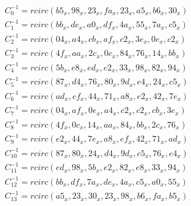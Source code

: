 \begin{gather}
C_0^{-1} = rcirc(b5_x, 98_x, 23_x, fa_x, 23_x, a5_x, b6_x, 30_x)\label{shirai-0-inv}\\
C_1^{-1} = rcirc(bb_x, de_x, a0_x, df_x, 4a_x, 55_x, 7a_x, c5_x)\label{shirai-1-inv}\\
C_2^{-1} = rcirc(04_x, a4_x, cb_x, af_x, c2_x, 3e_x, 0e_x, c2_x)\label{shirai-2-inv}\\
C_3^{-1} = rcirc(4f_x, aa_x, 2c_x, 0c_x, 84_x, 76_x, 14_x, bb_x)\label{shirai-3-inv}\\
C_4^{-1} = rcirc(5b_x, e8_x, ed_x, e2_x, 33_x, 98_x, 82_x, 94_x)\label{shirai-4-inv}\\
C_5^{-1} = rcirc(87_x, d4_x, 76_x, 80_x, 9d_x, e4_x, 24_x, c5_x)\label{shirai-5-inv}\\
C_6^{-1} = rcirc(ad_x, ef_x, 44_x, 71_x, a8_x, e2_x, 42_x, 7e_x)\label{shirai-6-inv}\\
C_7^{-1} = rcirc(04_x, af_x, 0e_x, a4_x, c2_x, c2_x, cb_x, 3e_x)\label{shirai-7-inv}\\
C_8^{-1} = rcirc(4f_x, 0c_x, 14_x, aa_x, 84_x, bb_x, 2c_x, 76_x)\label{shirai-8-inv}\\
C_9^{-1} = rcirc(e2_x, 44_x, 7e_x, a8_x, ef_x, 42_x, 71_x, ad_x)\label{shirai-9-inv}\\
C_{10}^{-1} = rcirc(87_x, 80_x, 24_x, d4_x, 9d_x, c5_x, 76_x, e4_x)\label{shirai-10-inv}\\
C_{11}^{-1} = rcirc(ed_x, 98_x, 5b_x, e2_x, 82_x, e8_x, 33_x, 94_x)\label{shirai-11-inv}\\
C_{12}^{-1} = rcirc(bb_x, df_x, 7a_x, de_x, 4a_x, c5_x, a0_x, 55_x)\label{shirai-12-inv}\\
C_{13}^{-1} = rcirc(a5_x, 23_x, 30_x, 23_x, 98_x, b6_x, fa_x, b5_x)\label{shirai-13-inv}
\end{gather}
